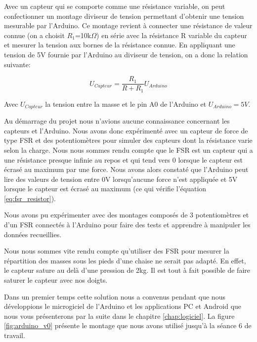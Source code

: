 \documentclass{polytech/polytech}
\begin{document}
Avec un capteur qui se comporte comme une résistance variable, on peut confectionner un montage diviseur de tension permettant d'obtenir une tension mesurable par l'Arduino. Ce montage revient à connecter une résistance de valeur connue (on a choisit $R_1$=10k$\Omega$) en série avec la résistance R variable du capteur et mesurer la tension aux bornes de la résistance connue.  En appliquant une tension de 5V fournie par l'Arduino au diviseur de tension, on a donc la relation suivante:

\begin{equation}
\label{eq:fsr_resistor}
U_{Capteur}= \frac{R_1}{ R + R_1} U_{Arduino} 
\end{equation}
 
 Avec $U_{Capteur}$ la tension entre la masse et le pin A0 de l'Arduino et $U_{Arduino}=5V$.
 
Au démarrage du projet nous n'avions aucune connaissance concernant les capteurs et l'Arduino. Nous avons donc expérimenté avec un capteur de force de type FSR et des potentiomètres pour simuler des capteurs dont la résistance varie selon la charge. Nous nous sommes rendu compte que le FSR est un capteur qui a une résistance presque infinie au repos et qui tend vers 0 lorsque le capteur est écrasé au maximum par une force. Nous avons alors constaté que l'Arduino peut lire des valeurs de tension entre 0V lorsqu'aucune force n'est appliquée et 5V lorsque le capteur est écrasé au maximum (ce qui vérifie l'équation \eqref{eq:fsr_resistor}).

Nous avons pu expérimenter avec des montages composés de 3 potentiomètres et d'un FSR connectés à l'Arduino pour faire des tests et apprendre à manipuler les données recueillies.

Nous nous sommes vite rendu compte qu'utiliser des FSR pour mesurer la répartition des masses sous les pieds d'une chaise ne serait pas adapté. En effet, le capteur sature au delà d'une pression de 2kg. Il est tout à fait possible de faire saturer le capteur avec nos doigts.

Dans un premier temps cette solution nous a convenus pendant que nous développions le microgiciel de l'Arduino et les applications PC et Android que nous vous présenterons par la suite dans le chapitre \ref{chap:logiciel}. La figure \ref{fig:arduino_v0} présente le montage que nous avons utilisé jusqu'à la séance 6 de travail.
\end{document}

